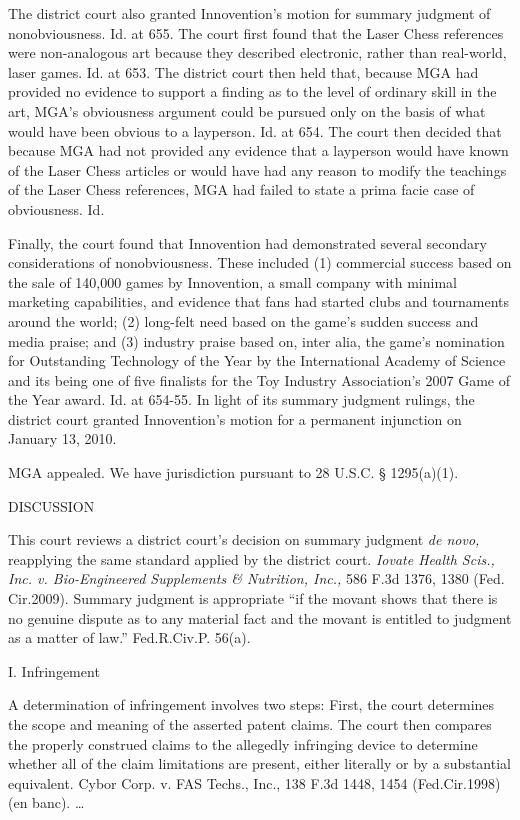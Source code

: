 The district court also granted Innovention's motion for summary judgment of
nonobviousness. Id. at 655. The court first found that the Laser Chess
references were non-analogous art because they described electronic, rather
than real-world, laser games. Id. at 653. The district court then held that,
because MGA had provided no evidence to support a finding as to the level of
ordinary skill in the art, MGA's obviousness argument could be pursued only on
the basis of what would have been obvious to a layperson. Id. at 654. The court
then decided that because MGA had not provided any evidence that a layperson
would have known of the Laser Chess articles or would have had any reason to
modify the teachings of the Laser Chess references, MGA had failed to state a
prima facie case of obviousness. Id.

Finally, the court found that Innovention had demonstrated several secondary
considerations of nonobviousness. These included (1) commercial success based
on the sale of 140,000 games by Innovention, a small company with minimal
marketing capabilities, and evidence that fans had started clubs and
tournaments around the world; (2) long-felt need based on the game's sudden
success and media praise; and (3) industry praise based on, inter alia, the
game's nomination for Outstanding Technology of the Year by the International
Academy of Science and its being one of five finalists for the Toy Industry
Association's 2007 Game of the Year award. Id. at 654-55. In light of its
summary judgment rulings, the district court granted Innovention's motion for a
permanent injunction on January 13, 2010.

MGA appealed. We have jurisdiction pursuant to 28 U.S.C. {\S} 1295(a)(1).

{\centering
DISCUSSION
\par}

This court reviews a district court's decision on summary judgment \textit{de
novo,} reapplying the same standard applied by the district court.
\textit{Iovate Health Scis., Inc. v. Bio-Engineered Supplements \& Nutrition,
Inc.,} 586 F.3d 1376, 1380 (Fed. Cir.2009). Summary judgment is appropriate
``if the movant shows that there is no genuine dispute as to any material fact
and the movant is entitled to judgment as a matter of law.'' Fed.R.Civ.P.
56(a).

{\centering
I. Infringement
\par}

A determination of infringement involves two steps: First, the court determines
the scope and meaning of the asserted patent claims. The court then compares
the properly construed claims to the allegedly infringing device to determine
whether all of the claim limitations are present, either literally or by a
substantial equivalent. Cybor Corp. v. FAS Techs., Inc., 138 F.3d 1448, 1454
(Fed.Cir.1998) (en banc). {\dots}

